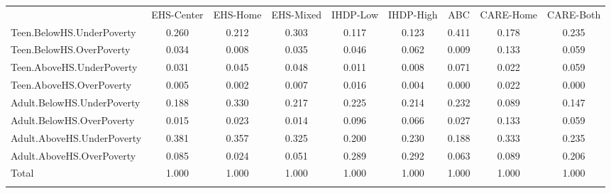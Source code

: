 \begin{tabular}{lcccccccc}
\hline \noalign{\smallskip} & EHS-Center & EHS-Home & EHS-Mixed & IHDP-Low & IHDP-High & ABC & CARE-Home & CARE-Both\\
\noalign{\smallskip}\hline \noalign{\smallskip}Teen.BelowHS.UnderPoverty & 0.260 & 0.212 & 0.303 & 0.117 & 0.123 & 0.411 & 0.178 & 0.235\\
Teen.BelowHS.OverPoverty & 0.034 & 0.008 & 0.035 & 0.046 & 0.062 & 0.009 & 0.133 & 0.059\\
Teen.AboveHS.UnderPoverty & 0.031 & 0.045 & 0.048 & 0.011 & 0.008 & 0.071 & 0.022 & 0.059\\
Teen.AboveHS.OverPoverty & 0.005 & 0.002 & 0.007 & 0.016 & 0.004 & 0.000 & 0.022 & 0.000\\
Adult.BelowHS.UnderPoverty & 0.188 & 0.330 & 0.217 & 0.225 & 0.214 & 0.232 & 0.089 & 0.147\\
Adult.BelowHS.OverPoverty & 0.015 & 0.023 & 0.014 & 0.096 & 0.066 & 0.027 & 0.133 & 0.059\\
Adult.AboveHS.UnderPoverty & 0.381 & 0.357 & 0.325 & 0.200 & 0.230 & 0.188 & 0.333 & 0.235\\
Adult.AboveHS.OverPoverty & 0.085 & 0.024 & 0.051 & 0.289 & 0.292 & 0.063 & 0.089 & 0.206\\
Total & 1.000 & 1.000 & 1.000 & 1.000 & 1.000 & 1.000 & 1.000 & 1.000\\
\noalign{\smallskip}\hline\end{tabular}\\

